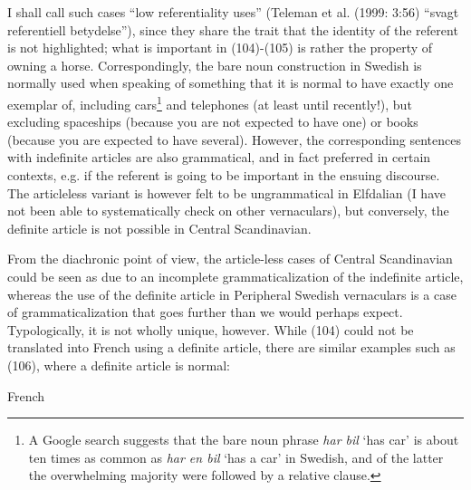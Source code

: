 \z

I shall call such cases “low referentiality uses” (Teleman et al. (1999: 3:56) “svagt referentiell betydelse”), since they share the trait that the identity of the referent is not highlighted; what is important in (104){}-(105) is rather the property of owning a horse. Correspondingly, the bare noun construction in Swedish is normally used when speaking of something that it is normal to have exactly one exemplar of, including cars\footnote{ A Google search suggests that the bare noun phrase \textit{har bil} ‘has car’ is about ten times as common as \textit{har en bil} ‘has a car’ in Swedish, and of the latter the overwhelming majority were followed by a relative clause. } and telephones (at least until recently!), but excluding spaceships (because you are not expected to have one) or books (because you are expected to have several). However, the corresponding sentences with indefinite articles are also grammatical, and in fact preferred in certain contexts, e.g. if the referent is going to be important in the ensuing discourse. The articleless variant is however felt to be ungrammatical in Elfdalian (I have not been able to systematically check on other vernaculars), but conversely, the definite article is not possible in Central Scandinavian. 


From the diachronic point of view, the article-less cases of Central Scandinavian could be seen as due to an incomplete grammaticalization of the indefinite article, whereas the use of the definite article in Peripheral Swedish vernaculars is a case of grammaticalization that goes further than we would perhaps expect. Typologically, it is not wholly unique, however. While (104) could not be translated into French using a definite article, there are similar examples such as (106), where a definite article is normal:


\item 

\label{bkm:Ref224102943}French


